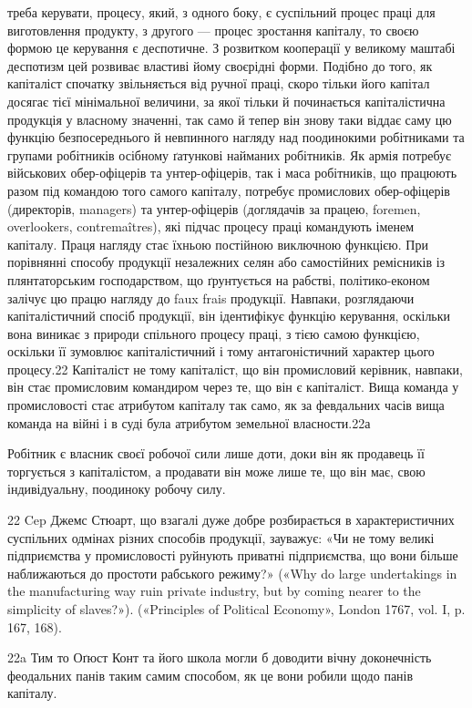 треба керувати, процесу, який, з одного боку, є суспільний процес
праці для виготовлення продукту, з другого — процес зростання
капіталу, то своєю формою це керування є деспотичне. З розвитком
кооперації у великому маштабі деспотизм цей розвиває властиві
йому своєрідні форми. Подібно до того, як капіталіст спочатку
звільняється від ручної праці, скоро тільки його капітал
досягає тієї мінімальної величини, за якої тільки й починається
капіталістична продукція у власному значенні, так само й тепер
він знову таки віддає саму цю функцію безпосереднього й невпинного
нагляду над поодинокими робітниками та групами робітників
осібному ґатункові найманих робітників. Як армія потребує
військових обер-офіцерів та унтер-офіцерів, так і маса робітників,
що працюють разом під командою того самого капіталу,
потребує промислових обер-офіцерів (директорів, managers)
та унтер-офіцерів (доглядачів за працею, foremen, overlookers,
contremaîtres), які підчас процесу праці командують іменем
капіталу. Праця нагляду стає їхньою постійною виключною
функцією. При порівнянні способу продукції незалежних селян
або самостійних ремісників із плянтаторським господарством,
що ґрунтується на рабстві, політико-економ залічує цю працю
нагляду до faux frais продукції. Навпаки, розглядаючи капіталістичний
спосіб продукції, він ідентифікує функцію керування,
оскільки вона виникає з природи спільного процесу праці, з
тією самою функцією, оскільки її зумовлює капіталістичний і
тому антагоністичний характер цього процесу.22 Капіталіст не
тому капіталіст, що він промисловий керівник, навпаки, він стає
промисловим командиром через те, що він є капіталіст. Вища
команда у промисловості стає атрибутом капіталу так само, як
за февдальних часів вища команда на війні і в суді була атрибутом
земельної власности.22а

Робітник є власник своєї робочої сили лише доти, доки він
як продавець її торгується з капіталістом, а продавати він може
лише те, що він має, свою індивідуальну, поодиноку робочу силу.

22    Cep Джемс Стюарт, що взагалі дуже добре розбирається в характеристичних
суспільних одмінах різних способів продукції, зауважує:
«Чи не тому великі підприємства у промисловості руйнують приватні
підприємства, що вони більше наближаються до простоти рабського режиму?»
(«Why do large undertakings in the manufacturing way ruin private
industry, but by coming nearer to the simplicity of slaves?»). («Principles
of Political Economy», London 1767, vol. I, p. 167, 168).

22a Тим то Оґюст Конт та його школа могли б доводити вічну доконечність
феодальних панів таким самим способом, як це вони робили
щодо панів капіталу.